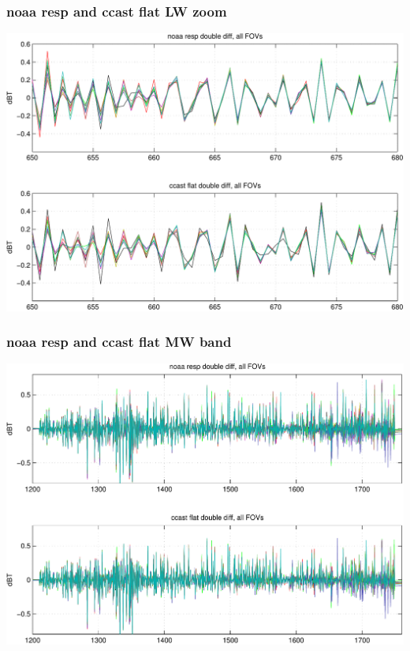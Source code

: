 \documentclass[11pt]{beamer}
\begin{document}
\begin{frame}
\frametitle{noaa resp and ccast flat LW zoom}
\begin{center}
  \includegraphics[scale=0.5]{figures/ddif_LW_zoom.pdf}
\end{center}
\end{frame}
\begin{frame}
\frametitle{noaa resp and ccast flat MW band}
\begin{center}
  \includegraphics[scale=0.5]{figures/ddif_MW_band.pdf}
\end{center}
\end{frame}
\end{document}
